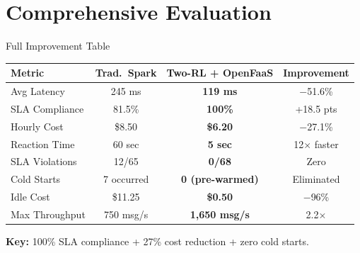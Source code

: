 \documentclass{beamer}
\begin{document}
\section{Comprehensive Evaluation}

\begin{frame}{Full Improvement Table}
\begin{table}[H]
\centering
\small
\begin{tabular}{|l|c|c|c|}
\hline
\textbf{Metric} & \textbf{Trad.\ Spark} & \textbf{Two-RL + OpenFaaS} & \textbf{Improvement} \\
\hline
Avg Latency & 245 ms & \textbf{119 ms} & \textcolor{rlgreen}{$-$51.6\%} \\
SLA Compliance & 81.5\% & \textbf{100\%} & \textcolor{rlgreen}{+18.5 pts} \\
Hourly Cost & \$8.50 & \textbf{\$6.20} & \textcolor{rlgreen}{$-$27.1\%} \\
Reaction Time & 60 sec & \textbf{5 sec} & \textcolor{rlgreen}{12$\times$ faster} \\
SLA Violations & 12/65 & \textbf{0/68} & \textcolor{rlgreen}{Zero} \\
Cold Starts & 7 occurred & \textbf{0 (pre-warmed)} & \textcolor{rlgreen}{Eliminated} \\
Idle Cost & \$11.25 & \textbf{\$0.50} & \textcolor{rlgreen}{$-$96\%} \\
Max Throughput & 750 msg/s & \textbf{1,650 msg/s} & \textcolor{rlgreen}{2.2$\times$} \\
\hline
\end{tabular}
\end{table}
\vspace{0.2cm}
\textbf{Key:} 100\% SLA compliance + 27\% cost reduction + zero cold starts.
\end{frame}
\end{document}
